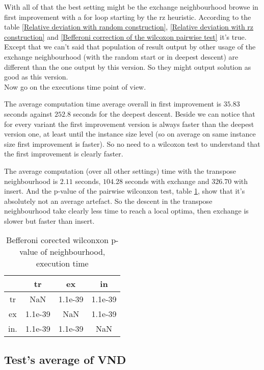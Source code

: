 \documentclass[12pt,a4paper]{article}
\begin{document}
With all of that the best setting might be the exchange neighbourhood browse in first improvement with a for loop starting by the rz heuristic. According to the table \ref{Relative deviation with random construction}, \ref{Relative deviation with rz construction} and \ref{Befferoni correction of the wilcoxon pairwise test} it's true. Except that we can't said that population of result output by other usage of the exchange neighbourhood (with the random start or in deepest descent) are different than the one output by this version. So they might output solution as good as this version.\\

Now go on the executions time point of view.

The average computation time average overall in first improvement is $35.83$ seconds against $252.8$ seconds for the deepest descent. Beside we can notice that for every variant the first improvement version is always faster than the deepest version one, at least until the instance size level (so on average on same instance size first improvement is faster). So no need to a wilcoxon test to understand that the first improvement is clearly faster.

The average computation (over all other settings) time with the transpose neighbourhood is $2.11$ seconds, $104.28$ seconds with exchange and $326.70$ with insert. And the p-value of the pairwise wilconxon test, table \ref{Befferoni corected wilconxon p-value of neighbourhood time}, show that it's absolutely not an average artefact. So the descent in the transpose neighbourhood take clearly less time to reach a local optima, then exchange is slower but faster than insert.
\begin{table}[!h]
\centering
\begin{tabular}{|*{4}{c|}}
  \hline
   & tr & ex & in\\
  \hline
	tr & NaN & 1.1e-39 & 1.1e-39 \\
	ex & 1.1e-39 & NaN & 1.1e-39 \\
	in. & 1.1e-39 & 1.1e-39 & NaN \\
  \hline
\end{tabular}
\caption{Befferoni corected wilconxon p-value of neighbourhood, execution time}
\label{Befferoni corected wilconxon p-value of neighbourhood time}
\end{table}
\subsection{Test's average of VND}
\end{document}
